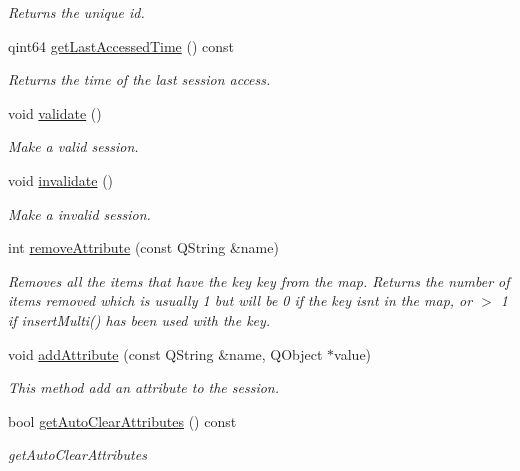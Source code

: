 \begin{DoxyCompactItemize}
\begin{DoxyCompactList}\small\item\em Returns the unique id. \end{DoxyCompactList}\item 
qint64 \hyperlink{class_http_session_a539bf0c99bad1aae86ff9b8f411740e1}{get\+Last\+Accessed\+Time} () const
\begin{DoxyCompactList}\small\item\em Returns the time of the last session access. \end{DoxyCompactList}\item 
void \hyperlink{class_http_session_adc118d02431eec30977bd1cb3429eb79}{validate} ()
\begin{DoxyCompactList}\small\item\em Make a valid session. \end{DoxyCompactList}\item 
void \hyperlink{class_http_session_a1656b24f54bcd539f01022323a3c3b3c}{invalidate} ()
\begin{DoxyCompactList}\small\item\em Make a invalid session. \end{DoxyCompactList}\item 
int \hyperlink{class_http_session_a9102eedc7002a96cd64c080af9c4ac47}{remove\+Attribute} (const Q\+String \&name)
\begin{DoxyCompactList}\small\item\em Removes all the items that have the key key from the map. Returns the number of items removed which is usually 1 but will be 0 if the key isn\textquotesingle{}t in the map, or $>$ 1 if insert\+Multi() has been used with the key. \end{DoxyCompactList}\item 
void \hyperlink{class_http_session_a9d7250801e2b43f61b28facf2b48c1b5}{add\+Attribute} (const Q\+String \&name, Q\+Object $\ast$value)
\begin{DoxyCompactList}\small\item\em This method add an attribute to the session. \end{DoxyCompactList}\item 
bool \hyperlink{class_http_session_a0bb33f4c387b07264245de390984be10}{get\+Auto\+Clear\+Attributes} () const
\begin{DoxyCompactList}\small\item\em get\+Auto\+Clear\+Attributes \end{DoxyCompactList}\item 

\end{DoxyCompactItemize}
